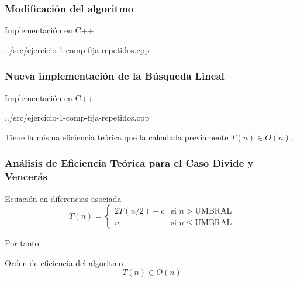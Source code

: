 \documentclass[13pt]{beamer}
\begin{document}
    \begin{frame}
        \frametitle{Modificación del algoritmo}

        
    \end{frame}

    \begin{frame}
        \begin{exampleblock}{Implementación en C++}
            
            {../src/ejercicio-1-comp-fija-repetidos.cpp} 
        \end{exampleblock}
    \end{frame}

    \begin{frame}
        \frametitle{Nueva implementación de la Búsqueda Lineal}

        \begin{exampleblock}{Implementación en C++}
            
{../src/ejercicio-1-comp-fija-repetidos.cpp} 
        \end{exampleblock}

        Tiene la misma eficiencia teórica que la calculada previamente $T(n) \in O(n)$. 
    \end{frame}

    \begin{frame}
        \frametitle{Análisis de Eficiencia Teórica para el Caso Divide y Vencerás}

        \begin{block}{Ecuación en diferencias asociada}
            \begin{equation}
                T(n) = \left\{ \begin{array}{lr} 2 T(n/2) + c & \text{si } n > \text{UMBRAL}\\ n & \text{si } n \leqslant \text{UMBRAL} \end{array} \right.
                \label{eq:1b-efi-dyv-rec}
            \end{equation}
        \end{block}

        Por tanto:

        \begin{alertblock}{Orden de eficiencia del algoritmo}
            \begin{equation*}
                \boxed{T(n) \in O(n)}
            \end{equation*}
        \end{alertblock}
        
    \end{frame}
\end{document}
